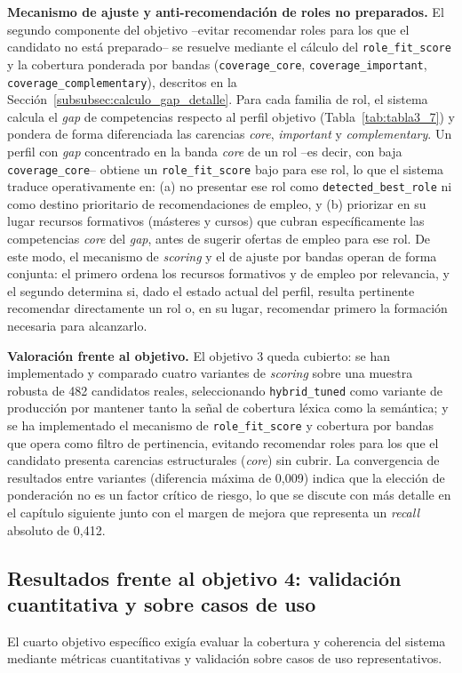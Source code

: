 \textbf{Mecanismo de ajuste y anti-recomendación de roles no preparados.} El segundo componente del objetivo --evitar recomendar roles para los que el candidato no está preparado-- se resuelve mediante el cálculo del \texttt{role\_fit\_score} y la cobertura ponderada por bandas (\texttt{coverage\_core}, \texttt{coverage\_important}, \texttt{coverage\_complementary}), descritos en la Sección~\ref{subsubsec:calculo_gap_detalle}. Para cada familia de rol, el sistema calcula el \textit{gap} de competencias respecto al perfil objetivo (Tabla~\ref{tab:tabla3_7}) y pondera de forma diferenciada las carencias \textit{core}, \textit{important} y \textit{complementary}. Un perfil con \textit{gap} concentrado en la banda \textit{core} de un rol --es decir, con baja \texttt{coverage\_core}-- obtiene un \texttt{role\_fit\_score} bajo para ese rol, lo que el sistema traduce operativamente en: (a) no presentar ese rol como \texttt{detected\_best\_role} ni como destino prioritario de recomendaciones de empleo, y (b) priorizar en su lugar recursos formativos (másteres y cursos) que cubran específicamente las competencias \textit{core} del \textit{gap}, antes de sugerir ofertas de empleo para ese rol. De este modo, el mecanismo de \textit{scoring} y el de ajuste por bandas operan de forma conjunta: el primero ordena los recursos formativos y de empleo por relevancia, y el segundo determina si, dado el estado actual del perfil, resulta pertinente recomendar directamente un rol o, en su lugar, recomendar primero la formación necesaria para alcanzarlo.

\textbf{Valoración frente al objetivo.} El objetivo 3 queda cubierto: se han implementado y comparado cuatro variantes de \textit{scoring} sobre una muestra robusta de 482 candidatos reales, seleccionando \texttt{hybrid\_tuned} como variante de producción por mantener tanto la señal de cobertura léxica como la semántica; y se ha implementado el mecanismo de \texttt{role\_fit\_score} y cobertura por bandas que opera como filtro de pertinencia, evitando recomendar roles para los que el candidato presenta carencias estructurales (\textit{core}) sin cubrir. La convergencia de resultados entre variantes (diferencia máxima de 0,009) indica que la elección de ponderación no es un factor crítico de riesgo, lo que se discute con más detalle en el capítulo siguiente junto con el margen de mejora que representa un \textit{recall} absoluto de 0,412.

\subsection{Resultados frente al objetivo 4: validación cuantitativa y sobre casos de uso}
\label{subsec:resultados_obj4}
El cuarto objetivo específico exigía evaluar la cobertura y coherencia del sistema mediante métricas cuantitativas y validación sobre casos de uso representativos.


